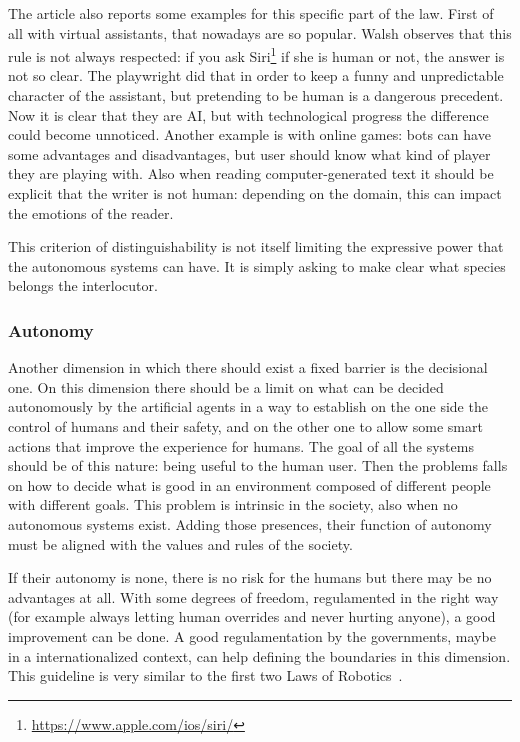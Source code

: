 The article also reports some examples for this specific part of the law. First of all with virtual assistants, that nowadays are so popular. Walsh observes that this rule is not always respected: if you ask Siri\footnote{\url{https://www.apple.com/ios/siri/}} if she is human or not, the answer is not so clear. The playwright did that in order to keep a funny and unpredictable character of the assistant, but pretending to be human is a dangerous precedent. Now it is clear that they are AI, but with technological progress the difference could become unnoticed. Another example is with online games: bots can have some advantages and disadvantages, but user should know what kind of player they are playing with. Also when reading computer-generated text it should be explicit that the writer is not human: depending on the domain, this can impact the emotions of the reader.

This criterion of distinguishability is not itself limiting the expressive power that the autonomous systems can have. It is simply asking to make clear what species belongs the interlocutor.

\subsubsection{Autonomy}
Another dimension in which there should exist a fixed barrier is the decisional one. On this dimension there should be a limit on what can be decided autonomously by the artificial agents in a way to establish on the one side the control of humans and their safety, and on the other one to allow some smart actions that improve the experience for humans. The goal of all the systems should be of this nature: being useful to the human user. Then the problems falls on how to decide what is good in an environment composed of different people with different goals. This problem is intrinsic in the society, also when no autonomous systems exist. Adding those presences, their function of autonomy must be aligned with the values and rules of the society.

If their autonomy is none, there is no risk for the humans but there may be no advantages at all. With some degrees of freedom, regulamented in the right way (for example always letting human overrides and never hurting anyone), a good improvement can be done.
A good regulamentation by the governments, maybe in a internationalized context, can help defining the boundaries in this dimension. This guideline is very similar to the first two Laws of Robotics~\cite{asimov1942runaround}.

